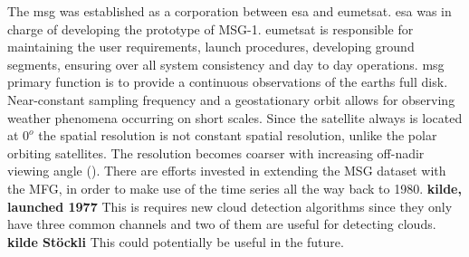 The \acrfull{msg} was established as a corporation between \acrfull{esa} and \acrfull{eumetsat}. \acrshort{esa} was in charge of developing the prototype of MSG-1. \acrshort{eumetsat} is responsible for maintaining the user requirements, launch procedures, developing ground segments, ensuring over all system consistency and day to day operations.  \acrshort{msg} primary function is to provide a continuous observations of the earths full disk. Near-constant sampling frequency and a geostationary orbit allows for observing weather phenomena occurring on short scales. Since the satellite always is located at $0^o$ the spatial resolution is not constant spatial resolution, unlike the polar orbiting satellites. The resolution becomes coarser with increasing off-nadir viewing angle (\cite{Stubenrauch2013AssessmentPanel}). There are efforts invested in extending the MSG dataset with the MFG, in order to make use of the time series all the way back to 1980. \textbf{kilde, launched 1977} This is requires new cloud detection algorithms since they only have three common channels and two of them are useful for detecting clouds. \textbf{kilde Stöckli} This could potentially be useful in the future. 

